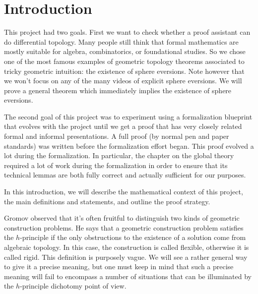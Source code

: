 \chapter*{Introduction}
\label{cha:intro}

This project had two goals. First we want to check whether a proof
assistant can do differential topology. Many people still think that
formal mathematics are mostly suitable for algebra, combinatorics, or
foundational studies. So we chose one of the most famous examples
of geometric topology theorems associated to tricky geometric intuition:
the existence of sphere eversions. Note however that we won't focus on
any of the many videos of explicit sphere eversions. We will prove a
general theorem which immediately implies the existence of sphere
eversions.

The second goal of this project was to experiment using a formalization
blueprint that evolves with the project until we get a proof that has
very closely related formal and informal presentations. A full proof (by
normal pen and paper standards) was written before the formalization
effort began. This proof evolved a lot during the formalization. In
particular, the chapter on the global theory required a lot of work
during the formalization in order to ensure that its technical lemmas
are both fully correct and actually sufficient for our purposes.

In this introduction, we will describe the mathematical context of this
project, the main definitions and statements, and outline the proof
strategy.

Gromov observed that it's often fruitful to distinguish two kinds of geometric
construction problems. He says that a geometric construction problem satisfies
the $h$-principle if the only obstructions to the existence of a solution come
from algebraic topology. In this case, the construction is called flexible,
otherwise it is called rigid. This definition is purposely vague. We
will see a rather general way to give it a precise meaning, but one must keep
in mind that such a precise meaning will fail to encompass a number of
situations that can be illuminated by the $h$-principle dichotomy point of view.

